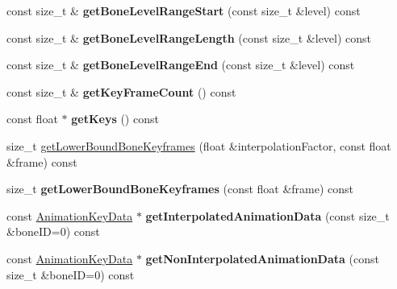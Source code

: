 \begin{DoxyCompactItemize}
\item 
const size\+\_\+t \& {\bfseries get\+Bone\+Level\+Range\+Start} (const size\+\_\+t \&level) const \hypertarget{classirr_1_1scene_1_1CFinalBoneHierarchy_a5b9b191cca693d282ca9a73bdffb7ce2}{}\label{classirr_1_1scene_1_1CFinalBoneHierarchy_a5b9b191cca693d282ca9a73bdffb7ce2}

\item 
const size\+\_\+t \& {\bfseries get\+Bone\+Level\+Range\+Length} (const size\+\_\+t \&level) const \hypertarget{classirr_1_1scene_1_1CFinalBoneHierarchy_af7b2aae797a70555fc5dc9f2e610a8ed}{}\label{classirr_1_1scene_1_1CFinalBoneHierarchy_af7b2aae797a70555fc5dc9f2e610a8ed}

\item 
const size\+\_\+t \& {\bfseries get\+Bone\+Level\+Range\+End} (const size\+\_\+t \&level) const \hypertarget{classirr_1_1scene_1_1CFinalBoneHierarchy_aa5d8d288132102e61dce15ffdb7d0212}{}\label{classirr_1_1scene_1_1CFinalBoneHierarchy_aa5d8d288132102e61dce15ffdb7d0212}

\item 
const size\+\_\+t \& {\bfseries get\+Key\+Frame\+Count} () const \hypertarget{classirr_1_1scene_1_1CFinalBoneHierarchy_abb07afd622f2e9a915e636aeb1398f08}{}\label{classirr_1_1scene_1_1CFinalBoneHierarchy_abb07afd622f2e9a915e636aeb1398f08}

\item 
const float $\ast$ {\bfseries get\+Keys} () const \hypertarget{classirr_1_1scene_1_1CFinalBoneHierarchy_a9b8bf03d3c967fe96a488d1e0a66f6cf}{}\label{classirr_1_1scene_1_1CFinalBoneHierarchy_a9b8bf03d3c967fe96a488d1e0a66f6cf}

\item 
size\+\_\+t \hyperlink{classirr_1_1scene_1_1CFinalBoneHierarchy_a73ab77d3cb4e1972faa34a43b94205e7}{get\+Lower\+Bound\+Bone\+Keyframes} (float \&interpolation\+Factor, const float \&frame) const 
\item 
size\+\_\+t {\bfseries get\+Lower\+Bound\+Bone\+Keyframes} (const float \&frame) const \hypertarget{classirr_1_1scene_1_1CFinalBoneHierarchy_a2ebef77caf191a4aa31daffa91effb54}{}\label{classirr_1_1scene_1_1CFinalBoneHierarchy_a2ebef77caf191a4aa31daffa91effb54}

\item 
const \hyperlink{structirr_1_1scene_1_1CFinalBoneHierarchy_1_1AnimationKeyData}{Animation\+Key\+Data} $\ast$ {\bfseries get\+Interpolated\+Animation\+Data} (const size\+\_\+t \&bone\+ID=0) const \hypertarget{classirr_1_1scene_1_1CFinalBoneHierarchy_ac52eae05ebf14e2d197c323bdb53ac57}{}\label{classirr_1_1scene_1_1CFinalBoneHierarchy_ac52eae05ebf14e2d197c323bdb53ac57}

\item 
const \hyperlink{structirr_1_1scene_1_1CFinalBoneHierarchy_1_1AnimationKeyData}{Animation\+Key\+Data} $\ast$ {\bfseries get\+Non\+Interpolated\+Animation\+Data} (const size\+\_\+t \&bone\+ID=0) const \hypertarget{classirr_1_1scene_1_1CFinalBoneHierarchy_a5ddd341f3f071885256b5bfe2a4b59b7}{}\label{classirr_1_1scene_1_1CFinalBoneHierarchy_a5ddd341f3f071885256b5bfe2a4b59b7}

\end{DoxyCompactItemize}
